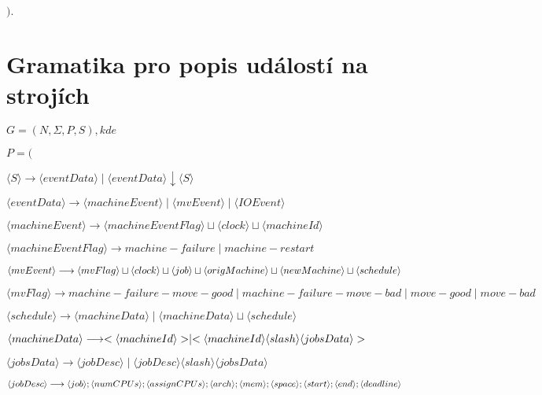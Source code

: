 \documentclass[draft]{fithesis}
\begin{document}
\begin{list}{}{$).$}
	\item
\end{list}

\section{Gramatika pro popis událostí na strojích}
$G = (N, \Sigma, P, S), kde$

\begin{list}{}{$P = ($}
	\item $\langle S \rangle 
		\longrightarrow 
		\langle eventData \rangle \mid \langle eventData \rangle \downarrow \langle S \rangle$
	\item $\langle eventData \rangle 
		\longrightarrow 
		\langle machineEvent \rangle \mid \langle mvEvent \rangle \mid \langle IOEvent \rangle$
	\item $\langle machineEvent \rangle 
		\longrightarrow 
		\langle machineEventFlag \rangle \sqcup \langle clock \rangle \sqcup \langle machineId \rangle$
	\item $\langle machineEventFlag \rangle 
		\longrightarrow 
		machine-failure \mid machine-restart$
	\item $\langle mvEvent \rangle 
		\longrightarrow 
		\langle mvFlag \rangle \sqcup \langle clock \rangle \sqcup \langle job \rangle \sqcup \langle origMachine \rangle \sqcup \\ \langle newMachine \rangle \sqcup \langle schedule \rangle$
	\item $\langle mvFlag \rangle 
		\longrightarrow 
		machine-failure-move-good \mid machine-failure-move-bad \mid move-good \mid move-bad$
	\item $\langle schedule \rangle 
		\longrightarrow 
		\langle machineData \rangle \mid \langle machineData \rangle \sqcup \langle schedule \rangle$
	\item $\langle machineData \rangle 
		\longrightarrow 
		< \langle machineId \rangle > \mid < \langle machineId \rangle \langle slash \rangle \\ \langle jobsData \rangle >$
	\item $\langle jobsData \rangle 
		\longrightarrow 
		\langle jobDesc \rangle \mid \langle jobDesc \rangle \langle slash \rangle \langle jobsData \rangle$
	\item $\langle jobDesc \rangle 
		\longrightarrow 
		\langle job \rangle ; \langle numCPUs \rangle ; \langle assignCPUs \rangle ; \langle arch \rangle ; \langle mem \rangle ;\\ \langle space \rangle ; \langle start \rangle ; \langle end \rangle ; \langle deadline \rangle$

\end{list}
\end{document}
